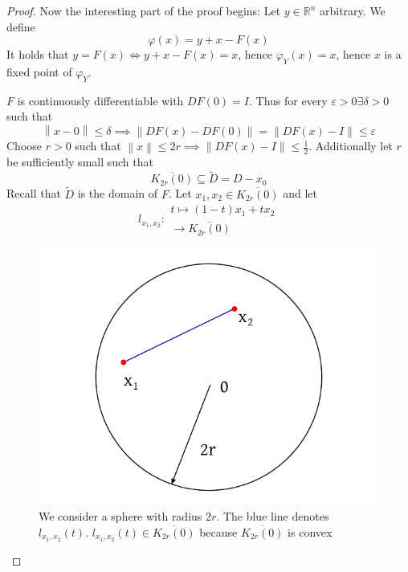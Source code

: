 \documentclass{article}
\newcommand{\norm}[1]{\left\|#1\right\|}
\begin{document}
\begin{proof}
  Now the interesting part of the proof begins:
  Let $y \in \mathbb R^n$ arbitrary. We define
  \[ \varphi(x) = y + x - F(x) \]
  It holds that $y = F(x) \iff y + x - F(x) = x$, hence $\varphi_Y(x) = x$, hence $x$ is a fixed point of $\varphi_Y$.
  
  $F$ is continuously differentiable with $DF(0) = I$. Thus for every $\varepsilon > 0 \exists \delta > 0$ such that
  \[ \norm{x - 0} \leq \delta \implies \norm{DF(x) - DF(0)} = \norm{DF(x) - I} \leq \varepsilon \]
  Choose $r > 0$ such that $\norm{x} \leq 2r \implies \norm{DF(x) - I} \leq \frac12$.
  Additionally let $r$ be sufficiently small such that
  \[ \overline{K_{2r}(0)} \subseteq \tilde D = D - x_0 \]
  Recall that $\tilde D$ is the domain of $F$.
  Let $x_1, x_2 \in \overline{K_{2r}(0)}$ and let
  \[ l_{x_1,x_2}: \substack{t \mapsto (1 - t) x_1 + t x_2 \\ [0, 1] \to \overline{K_{2r}(0)}} \]
  
  \begin{figure}[t]
    \begin{center}
      \includegraphics{img/35_x1x2.pdf}
      \caption{We consider a sphere with radius $2r$. The blue line denotes $l_{x_1, x_2}(t)$. $l_{x_1, x_2}(t) \in \overline{K_{2r}(0)}$ because $\overline{K_{2r}(0)}$ is convex}
      \label{img:x1x2}
    \end{center}
  \end{figure}
  

\end{proof}
\end{document}
